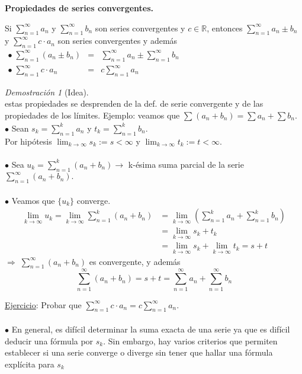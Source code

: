 \documentclass{article}
\theoremstyle{definition}
\theoremstyle{definition}
\theoremstyle{remark}
\newtheorem*{demo}{Demostración}
\begin{document}
\begin{center}
\textbf{Propiedades de series convergentes.}
\end{center}
\begin{teo}
  Si $\sum_{n=1}^{\infty}{a_n}$ y $\sum_{n=1}^{\infty}{b_n}$ son series convergentes y $c \in \mathbb{R}$, entonces $\sum_{n=1}^{\infty}{a_n \pm b_n}$ y $\sum_{n=1}^{\infty}{c\cdot a_n}$ son series convergentes y además \\ $\begin{array}{lcl}
    \bullet \; \sum_{n=1}^{\infty}{(a_n \pm b_n)}&=&\sum_{n=1}^{\infty}{a_n} \pm \sum_{n=1}^{\infty}{b_n}\\
    \bullet \; \sum_{n=1}^{\infty}{c\cdot a_n}&=&c\sum_{n=1}^{\infty}{a_n}
  \end{array}$
\end{teo}
\pagebreak 
\begin{demo}[Idea] \; \\
  estas propiedades se desprenden de la def. de serie convergente y de las propiedades de los límites. Ejemplo: veamos que $\sum_{}^{}{(a_n+b_n)}=\sum a_n + \sum b_n$. \\
  $\bullet$ \; Sean $s_k=\sum_{n=1}^ka_n$ y $t_k=\sum_{n=1}^{k}{b_n}.$ \\
  Por hipótesis $\lim_{k\to\infty}{s_k}:=s<\infty$ y $\lim_{k \to \infty}{t_k}:=t<\infty.$ \\\\
  $\bullet$ \; Sea $u_k=\sum_{n=1}^{k}{(a_n+b_n)}\rightarrow $ k-ésima suma parcial de la serie $\sum_{n=1}^{\infty}{(a_n+b_n)}.$ \\\\
  $\bullet$ \; Veamos que $\{u_k\}$ converge. \\
  \begin{align*}
    \lim_{k \to \infty}{u_k} = \lim_{k\to\infty}{\sum_{n=1}^{k}{(a_n+b_n)}} &= \lim_{k\to\infty}{\left(\sum_{n=1}^{k}{a_n}+\sum_{n=1}^{k}{b_n}\right)} \\
                                                                            &= \lim_{k\to\infty}{s_k+t_k} \\
                                                                            &= \lim_{k\to\infty}{s_k}+\lim_{k \to \infty}{t_k} = s+t
  \end{align*}
$\Rightarrow \; \sum_{n=1}^{\infty}{(a_n+b_n)}$ es convergente, y además $$\sum_{n=1}^{\infty}{(a_n+b_n)} = s+t=\sum_{n=1}^{\infty}{a_n}+\sum_{n=1}^{\infty}{b_n}$$ 
\end{demo}
\underline{Ejercicio}: Probar que $\sum_{n=1}^{\infty}{c\cdot a_n}=c\sum_{n=1}^{\infty}{a_n}$.
\\\\
$\bullet$ \; En general, es difícil determinar la suma exacta de una serie ya que es difícil deducir una fórmula por $s_k$. Sin embargo, hay varios criterios que permiten establecer si una serie converge o diverge sin tener que hallar una fórmula explícita para $s_k$
\end{document}

